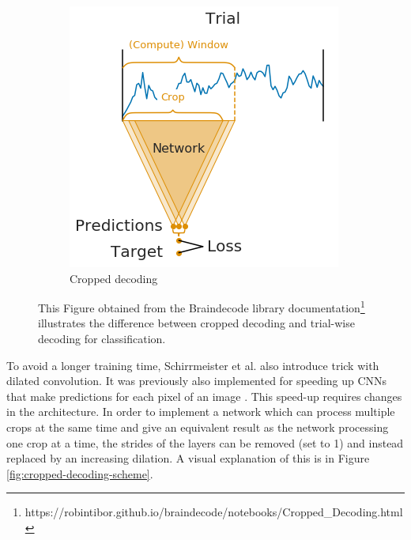 \begin{figure}[!htpb]
\begin{subfigure}[b]{0.55\textwidth}
   \includegraphics[width=0.9\linewidth]{img/ch3/trialwise-explanation2.png} \caption{Cropped decoding}
\end{subfigure}\label{fig:trial-wise-decoding-cropped}
\caption[Trial-wise vs. cropped decoding]{This Figure obtained from the Braindecode library documentation\footnote{https://robintibor.github.io/braindecode/notebooks/Cropped\_Decoding.html} illustrates the difference between cropped decoding and trial-wise decoding for classification.}
\end{figure}\label{fig:trial-wise-decoding} 

To avoid a longer training time, Schirrmeister et al.\cite{schirrmeister-deep-2017} also introduce trick with dilated convolution.
It was previously also implemented for speeding up CNNs that make predictions for each pixel of an image \cite{}. 
This speed-up requires changes in the architecture.
In order to implement a network which can process multiple crops at the same time and give an equivalent result as the network processing one crop at a time, the strides of the layers can be removed (set to 1) and instead replaced by an increasing dilation.
A visual explanation of this is in Figure \ref{fig:cropped-decoding-scheme}.

